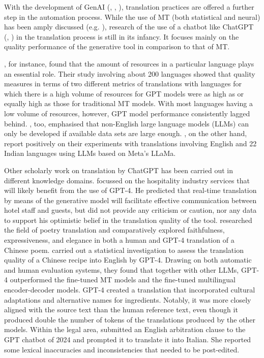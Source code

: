 \documentclass[output=paper]{langscibook}
\begin{document}
With the development of GenAI (\citealt{eloundou2023gptsgptsearlylook}, \citealt{felten2023languagemodelerslikechatgpt}, \citealt{a24}), translation practices are offered a further step in the automation process. While the use of MT (both statistical and neural) has been amply discussed (e.g. \citealt{moorkens_automating_2025}), research of the use of a chatbot like ChatGPT (\citealt{openai_text}, \citealt{roumeliotis2023}) in the translation process is still in its infancy. It focuses mainly on the quality performance of the generative tool in comparison to that of MT. 

\citet{robinson2023_chathiresource}, for instance, found that the amount of resources in a particular language plays an essential role. Their study involving about 200 languages showed that quality measures in terms of two different metrics of translations with languages for which there is a high volume of resources for GPT models were as high as or equally high as those for traditional MT models. With most languages having a low volume of resources, however, GPT model performance consistently lagged behind. \citet{geng2024transformchatlargelanguage}, too, emphasised that non-English large language models (LLMs) can only be developed if available data sets are large enough. \citet{mujadia2023assessingtranslationcapabilitieslarge}, on the other hand, report positively on their experiments with translations involving English and 22 Indian languages using LLMs based on Meta's LLaMa.

Other scholarly work on translation by ChatGPT has been carried out in different knowledge domains. \citet{ulku2023} focussed on the hospitality industry services that will likely benefit from the use of GPT-4. He predicted that real-time translation by means of the generative model will facilitate effective communication between hotel staff and guests, but did not provide any criticism or caution, nor any data to support his optimistic belief in the translation quality of the tool. \citet{teng2024} researched the field of poetry translation and comparatively explored faithfulness, expressiveness, and elegance in both a human and GPT-4 translation of a Chinese poem. \citet{cao2023exploringeffectivenesschatgptbasedfeedback} carried out a statistical investigation to assess the translation quality of a Chinese recipe into English by GPT-4. Drawing on both automatic and human evaluation systems, they found that together with other LLMs, GPT-4 outperformed the fine-tuned MT models and the fine-tuned multilingual encoder-decoder models. GPT-4 created a translation that incorporated cultural adaptations and alternative names for ingredients. Notably, it was more closely aligned with the source text than the human reference text, even though it produced double the number of tokens of the translations produced by the other models. Within the legal area, \citet{giampieri24} submitted an English arbitration clause to the GPT chatbot of 2024 and prompted it to translate it into Italian. She reported some lexical inaccuracies and inconsistencies that needed to be post-edited. 
\end{document}
